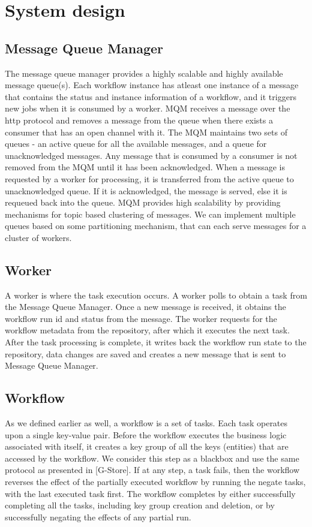 \section{System design}\label{sec:design}

\subsection{Message Queue Manager}
The message queue manager provides a highly scalable and highly available message queue(s). Each workflow instance
  has atleast one instance of a message that contains the status and instance
  information of a workflow, and it triggers new jobs when it is consumed by a worker.
  MQM receives a message over the http protocol and removes a message from the
  queue when there exists a consumer that has an open channel with it. The MQM maintains
  two sets of queues - an active queue for all the available messages, and a
  queue for unacknowledged messages. Any message that is consumed by a consumer
  is not removed from the MQM until it has been acknowledged. When a message is
  requested by a worker for processing, it is transferred from the active queue
  to unacknowledged queue. If it is acknowledged, the message is served, else it
  is requeued back into the queue. MQM provides high scalability by providing
  mechanisms for topic based clustering of messages. We can implement multiple
  queues based on some partitioning mechanism, that can each serve messages for a cluster of workers.
\subsection{Worker}
A worker is where the task execution occurs. A worker polls to obtain a task
from the Message Queue Manager. Once a new message is received, it obtains the
workflow run id and status from the message. The worker requests for the
workflow metadata from the repository, after which it executes the next task. After the task processing
is complete, it writes back the workflow run state to the repository, data
changes are saved and creates a new message that is sent to Message Queue
Manager. 
\subsection{Workflow}
As we defined earlier as well, a workflow is a set of tasks. Each task operates
upon a single key-value pair. Before the workflow executes the business logic
associated with itself, it creates a key group of all the keys (entities) that
are accessed by the workflow. We consider this step as a blackbox and use the
same protocol as presented in [G-Store]. If at any step, a task fails, then the
workflow reverses the effect of the partially executed workflow by running the
negate tasks, with the last executed task first. The workflow completes by
either successfully completing all the tasks, including key group creation and
deletion, or by successfully negating the effects of any partial run. 
